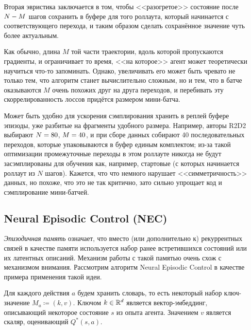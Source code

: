 Вторая эвристика заключается в том, чтобы <<разогретое>> состояние после $N \HM- M$ шагов сохранить в буфере для того роллаута, который начинается с соответствующего перехода, и таким образом сделать сохранённое значение чуть более актуальным.

Как обычно, длина $M$ той части траектории, вдоль которой пропускаются градиенты, и ограничивает то время, <<на которое>> агент может теоретически научиться что-то запоминать. Однако, увеличивать его может быть чревато не только тем, что алгоритм станет вычислительно сложным, но и тем, что в батче оказываются $M$ очень похожих друг на друга переходов, и перебивать эту скоррелированность лоссов придётся размером мини-батча.

\begin{remark}
Может быть удобно для ускорения сэмплирования хранить в реплей буфере эпизоды, уже разбитые на фрагменты удобного размера. Например, авторы R2D2 выбирают $N \HM= 80$, $M \HM= 40$, и при сборе данных собирают 40 последовательных переходов, которые упаковываются в буфер единым комплектом; из-за такой оптимизации промежуточные переходы в этом роллауте никогда не будут засэмплированы для обучения как, например, стартовые (с которых начинается роллаут из $N$ шагов). Кажется, что что немного нарушает <<симметричность>> данных, но похоже, что это не так критично, зато сильно упрощает код и сэмплирование мини-батчей.
\end{remark}

\subsection{Neural Episodic Control (NEC)}

\emph{Эпизодичная память} означает, что вместо (или дополнительно к) рекуррентных связей в качестве памяти используется набор ранее встретившихся состояний или их латентных описаний. Механизм работы с такой памятью очень схож с механизмом внимания. Рассмотрим алгоритм Neural Episodic Control в качестве примера применения такой идеи.

Для каждого действия $a$ будем хранить словарь, то есть некоторый набор ключ-значение $M_a \coloneqq (k, v)$. Ключом $k \in \mathbb{R}^d$ является вектор-эмбеддинг, описывающий некоторое состояние $s$ из опыта агента. Значением $v$ является скаляр, оценивающий $Q^*(s, a)$.

